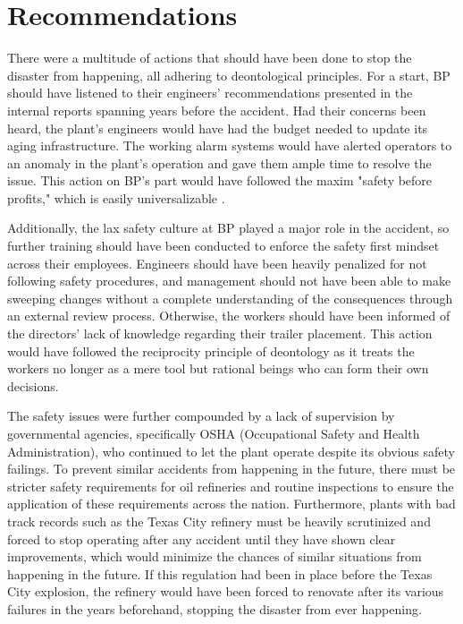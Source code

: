 \documentclass[12pt]{article}
\begin{document}
	\section*{Recommendations}
	There were a multitude of actions that should have been done to stop the disaster from happening, all adhering to deontological principles. For a start, BP should have listened to their engineers' recommendations presented in the internal reports spanning years before the accident. Had their concerns been heard, the plant's engineers would have had the budget needed to update its aging infrastructure. The working alarm systems would have alerted operators to an anomaly in the plant's operation and gave them ample time to resolve the issue. This action on BP's part would have followed the maxim "safety before profits," which is easily universalizable . 
	
	Additionally, the lax safety culture at BP played a major role in the accident, so further training should have been conducted to enforce the safety first mindset across their employees. Engineers should have been heavily penalized for not following safety procedures, and management should not have been able to make sweeping changes without a complete understanding of the consequences through an external review process. Otherwise, the workers should have been informed of the directors' lack of knowledge regarding their trailer placement. This action would have followed the reciprocity principle of deontology as it treats the workers no longer as a mere tool but rational beings who can form their own decisions. 
	
	The safety issues were further compounded by a lack of supervision by governmental agencies, specifically OSHA (Occupational Safety and Health Administration), who continued to let the plant operate despite its obvious safety failings. To prevent similar accidents from happening in the future, there must be stricter safety requirements for oil refineries and routine inspections to ensure the application of these requirements across the nation. Furthermore, plants with bad track records such as the Texas City refinery must be heavily scrutinized and forced to stop operating after any accident until they have shown clear improvements, which would minimize the chances of similar situations from happening in the future. If this regulation had been in place before the Texas City explosion, the refinery would have been forced to renovate after its various failures in the years beforehand, stopping the disaster from ever happening.
	
\end{document}
